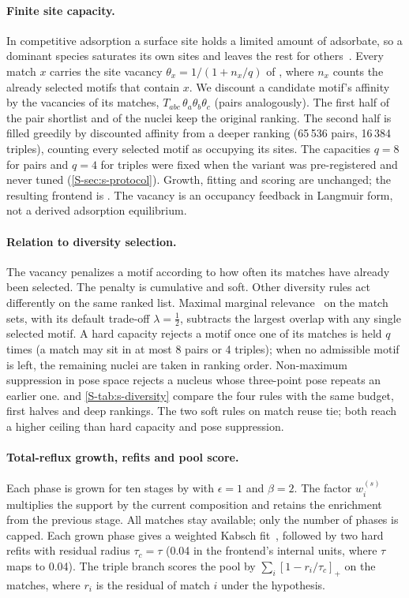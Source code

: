 \paragraph{Finite site capacity.} In competitive adsorption a surface site holds a limited amount of adsorbate, so a dominant species saturates its own sites and leaves the rest for others~\cite{langmuir1918}. Every match $x$ carries the site vacancy $\theta_x=1/(1+n_x/q)$ of , where $n_x$ counts the already selected motifs that contain $x$. We discount a candidate motif's affinity by the vacancies of its matches, $T_{abc}\,\theta_a\theta_b\theta_c$ (pairs analogously). The first half of the pair shortlist and of the nuclei keep the original ranking. The second half is filled greedily by discounted affinity from a deeper ranking (65\,536 pairs, 16\,384 triples), counting every selected motif as occupying its sites. The capacities $q=8$ for pairs and $q=4$ for triples were fixed when the variant was pre-registered and never tuned (\cref{S-sec:s-protocol}). Growth, fitting and scoring are unchanged; the resulting frontend is \ls{}. The vacancy is an occupancy feedback in Langmuir form, not a derived adsorption equilibrium.

\paragraph{Relation to diversity selection.} The vacancy penalizes a motif according to how often its matches have already been selected. The penalty is cumulative and soft. Other diversity rules act differently on the same ranked list. Maximal marginal relevance~\cite{carbonell1998mmr} on the match sets, with its default trade-off $\lambda=\frac12$, subtracts the largest overlap with any single selected motif. A hard capacity rejects a motif once one of its matches is held $q$ times (a match may sit in at most 8 pairs or 4 triples); when no admissible motif is left, the remaining nuclei are taken in ranking order. Non-maximum suppression in pose space rejects a nucleus whose three-point pose repeats an earlier one.  and \cref{S-tab:s-diversity} compare the four rules with the same budget, first halves and deep rankings. The two soft rules on match reuse tie; both reach a higher ceiling than hard capacity and pose suppression.

\paragraph{Total-reflux growth, refits and pool score.} Each phase is grown for ten stages by  with $\epsilon=1$ and $\beta=2$. The factor $w_i^{(s)}$ multiplies the support by the current composition and retains the enrichment from the previous stage. All matches stay available; only the number of phases is capped. Each grown phase gives a weighted Kabsch fit~\cite{kabsch1976}, followed by two hard refits with residual radius $\tau_c=\tau$ (0.04 in the frontend's internal units, where $\tau$ maps to 0.04). The triple branch scores the pool by $\sum_i[1-r_i/\tau_c]_+$ on the matches, where $r_i$ is the residual of match $i$ under the hypothesis.

